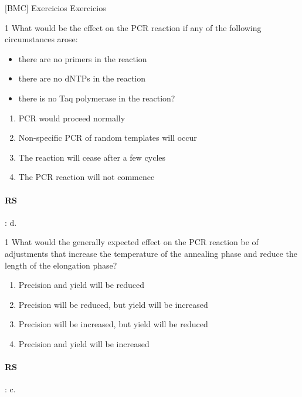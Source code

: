 \documentclass[\mainfilename]{subfiles}
\begin{document}
\renewcommand\theenumi{\alph{enumi}}

[BMC]
{Exercicios}
{Exercicios}

\begin{questionBox}1{ %
    What would be the effect on the PCR reaction if any of the following circumstances arose:
} %
    \begin{itemize}
        \item there are no primers in the reaction
        \item there are no dNTPs in the reaction
        \item there is no Taq polymerase in the reaction?
    \end{itemize}

    \begin{enumerate}[label=\alph{enumi})]
        \item PCR would proceed normally
        \item Non-specific PCR of random templates will occur 
        \item The reaction will cease after a few cycles
        \item The PCR reaction will not commence
    \end{enumerate}

    \paragraph*{RS}: d. 
\end{questionBox}

\begin{questionBox}1{ %
    What would the generally expected effect on the PCR reaction be of adjustments that increase the temperature of the annealing phase and reduce the length of the elongation phase?
} %
    \begin{enumerate}[label=\alph{enumi})]
        \item Precision and yield will be reduced
        \item Precision will be reduced, but yield will be increased
        \item Precision will be increased, but yield will be reduced
        \item Precision and yield will be increased        
    \end{enumerate}

    \paragraph*{RS}: c.

\end{questionBox}
\end{document}
